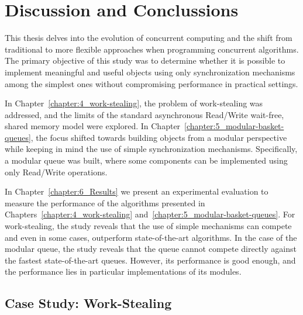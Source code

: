 \chapter{Discussion and Conclussions}

This thesis delves into the evolution of concurrent computing and the shift from traditional to more flexible approaches when programming concurrent algorithms. The primary objective of this study was to determine whether it is possible to implement meaningful and useful objects using only synchronization mechanisms among the simplest ones without compromising performance in practical settings.

In Chapter~\ref{chapter:4_work-stealing}, the problem of work-stealing was addressed, and the limits of the standard asynchronous Read/Write wait-free, shared memory model were explored. In Chapter~\ref{chapter:5_modular-basket-queues}, the focus shifted towards building objects from a modular perspective while keeping in mind the use of simple synchronization mechanisms. Specifically, a modular queue was built, where some components can be implemented using only Read/Write operations.


In Chapter~\ref{chapter:6_Results} we present an experimental evaluation to measure the performance of the algorithms presented in Chapters~\ref{chapter:4_work-stealing} and~\ref{chapter:5_modular-basket-queues}. For work-stealing, the study reveals that the use of simple mechanisms can compete and even in some cases, outperform state-of-the-art algorithms. In the case of the modular queue, the study reveals that the queue cannot compete directly against the fastest state-of-the-art queues. However, its performance is good enough, and the performance lies in particular implementations of its modules.

\section{\label{sec:experiment-conclussions} Case Study: Work-Stealing}

